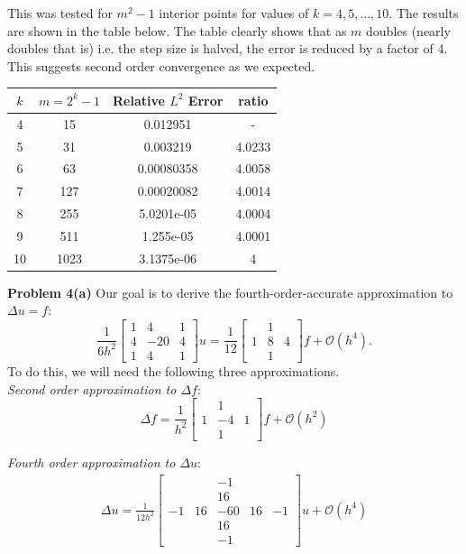 \documentclass[12pt]{article}
\newcommand{\problem}[1]{\hspace{-4 ex} \large \textbf{Problem #1} }
\begin{document}
This was tested for $m^2-1$ interior points for values of $k=4, 5, ..., 10$. The results are shown in the table below. The table clearly shows that as $m$ doubles (nearly doubles that is) i.e. the step size is halved, the error is reduced by a factor of 4. This suggests second order convergence as we expected.

\begin{center}
	\begin{tabular}{|c|c|c|c|}
		\hline
		$k$&$m=2^k-1$&Relative $L^2$ Error&ratio\\ \hline
		4&15&0.012951&-\\ \hline
		5&31&0.003219&4.0233\\ \hline
		6&63&0.00080358&4.0058\\ \hline
		7&127&0.00020082&4.0014\\ \hline
		8&255&5.0201e-05&4.0004\\ \hline
		9&511&1.255e-05&4.0001\\ \hline
		10&1023&3.1375e-06&4\\ \hline
	\end{tabular}
\end{center}

\bigbreak
\problem{4(a)} Our goal is to derive the fourth-order-accurate approximation to $\Delta u = f$:
$$
\frac{1}{6h^2}\begin{bmatrix}1 & 4 & 1\\4 & -20&4\\1&4&1\end{bmatrix}u = \frac{1}{12}\begin{bmatrix} & 1 & \\1 & 8&4\\&1&\end{bmatrix}f + \mathcal{O}(h^4).
$$
To do this, we will need the following three approximations.\\
\textit{Second order approximation to $\Delta f$}:
$$
\Delta f = \frac{1}{h^2}\begin{bmatrix}&1&\\1&-4&1\\&1&\end{bmatrix}f + \mathcal{O}(h^2)
$$

\textit{Fourth order approximation to $\Delta u$}:
\begin{align}
\Delta u = \frac{1}{12h^2}\begin{bmatrix}&&-1&&\\&&16&&\\-1&16&-60&16&-1\\&&16&&\\&&-1&&\end{bmatrix}u + \mathcal{O}(h^4) \label{fourthOrder}
\end{align}
\end{document}
